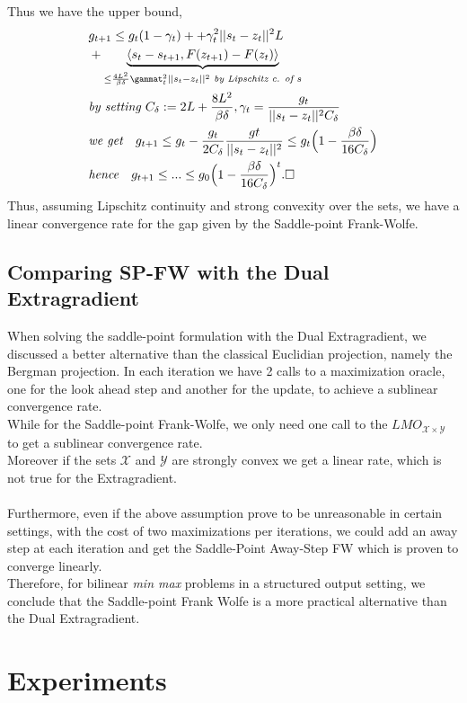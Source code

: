 \documentclass{article}
\begin{document}
Thus we have the upper bound,
\begin{equation*}
\begin{aligned}
    &g_{t+1}\leq g_{t}(1-\gamma_{t})+ + \gamma_{t}^{2}||s_{t}-z_{t}||^{2}L\\
    &+ \underbrace{\langle s_{t}- s_{t+1}, F(z_{t+1})- F(z_{t})\rangle}_{\leq \frac{4L^{2}}{\beta\delta}\gammat_{t}^{2}||s_{t}- z_{t}||^{2}\textit{ by Lipschitz c. of $s$}}\\
    &\textit{by setting } C_{\delta}:= 2L+ \frac{8L^{2}}{\beta\delta}, \gamma_{t}=\frac{g_{t}}{||s_{t}-z_{t}||^{2}C_{\delta}}\\
    &\textit{we get}\quad g_{t+1}\leq g_{t}- \frac{g_{t}}{2C_{\delta}}\frac{g{t}}{||s_{t}-z_{t}||^{2}}\leq g_{t}\Big(1-\frac{\beta\delta}{16C_{\delta}}\Big)\\
    &\textit{hence}\quad g_{t+1}\leq ...\leq g_{0}\Big(1-\frac{\beta\delta}{16C_{\delta}}\Big)^{t}.\Box
\end{aligned}
\end{equation*}
Thus, assuming Lipschitz continuity and strong convexity over the sets, we have a linear convergence rate for the gap given by the Saddle-point Frank-Wolfe.
\subsection{Comparing SP-FW with the Dual Extragradient}
When solving the saddle-point formulation with the Dual Extragradient, we discussed a better alternative than the classical Euclidian projection, namely the Bergman projection. In each iteration we have 2 calls to a maximization oracle, one for the look ahead step and another for the update, to achieve a sublinear convergence rate.\\
While for the Saddle-point Frank-Wolfe, we only need one call to the $LMO_{\mathcal{X}\times\mathcal{Y}}$ to get a sublinear convergence rate.\\
Moreover if the sets $\mathcal{X}$ and $\mathcal{Y}$ are strongly convex we get a linear rate, which is not true for the Extragradient.\\
\\
Furthermore, even if the above assumption prove to be unreasonable in certain settings, with the cost of two maximizations per iterations, we could add an away step at each iteration and get the Saddle-Point Away-Step FW which is proven to converge linearly.\\
Therefore, for bilinear \textit{min max} problems in a structured output setting, we conclude that the Saddle-point Frank Wolfe is a more practical alternative than the Dual Extragradient.

\section{Experiments}






\end{document}
